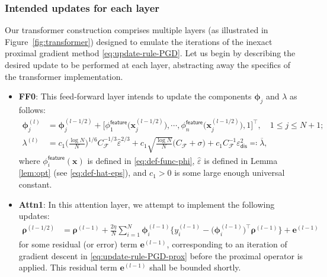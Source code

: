 \documentclass[english]{article}
\begin{document}
\subsubsection{Intended updates for each layer} 
%
Our transformer construction comprises multiple layers (as illustrated in Figure~\ref{fig:transformer}) designed to emulate the iterations of the inexact proximal gradient method \eqref{eq:update-rule-PGD}. 
Let us begin by describing the desired update to be performed at each layer, abstracting away the specifics of the transformer implementation.  
%
\begin{itemize}
\item \textbf{FF0}: This feed-forward layer intends to update the components ${\bm \phi}_j$ and $\lambda$ as follows: 
%
\begin{subequations}
\label{eq:update-rule-FF0-effective}
\begin{align}
{\bm \phi}_j^{(l)} &= {\bm \phi}_j^{(l-1/2)} + \big[\phi_1^{\mathsf{feature}}\big({\bm x}_j^{(l-1/2)}\big),\cdots,\phi_n^{\mathsf{feature}}\big({\bm x}_j^{(l-1/2)}\big), 1 \big]^{\top},\quad 1\le j\le N+1; \\
\lambda^{(l)} &=c_1\Big(\frac{\log N}{N}\Big)^{1/6} C_{\mathcal{F}}^{-1/3}\widehat{\varepsilon}^{2/3} + c_1\sqrt{\frac{\log N}{N}}\Big(C_{\mathcal{F}} + \sigma\Big) + c_1C_{\mathcal{F}}^{-1}\varepsilon_{\mathsf{dis}}^2\eqqcolon \overline{\lambda},
\label{eq:defn-lambda-bar-FF0}
\end{align}
\end{subequations}
%
where $\phi_i^{\mathsf{feature}}({\bm x})$ is defined in \eqref{eq:def-func-phi}, $\widehat{\varepsilon}$ is defined in Lemma \ref{lem:opt} (see \eqref{eq:def-hat-eps}), and $c_1>0$ is some large enough universal constant.

\item \textbf{Attn1}: In this attention layer, we attempt to implement the following updates: 
%
\begin{align}
{\bm \rho}^{(l-1/2)} 
&={\bm \rho}^{(l-1)}  + \frac{2\eta}{N}\sum_{i = 1}^{N} {\bm \phi}_i^{(l-1)}\Big\{y_i^{(l-1)} - \big({\bm \phi}_i^{(l-1)}\big)^{\top}{\bm \rho}^{(l-1)}\Big\} + {\bm e}^{(l-1)}
\label{eq:Attn1-true-update-e}
\end{align}
%
for some residual (or error) term $\bm{e}^{(l-1)}$, corresponding to an iteration of gradient descent in \eqref{eq:update-rule-PGD-prox} before the proximal operator is applied. 
This residual term $\bm{e}^{(l-1)}$ shall be bounded shortly. 


\end{itemize}
\end{document}
